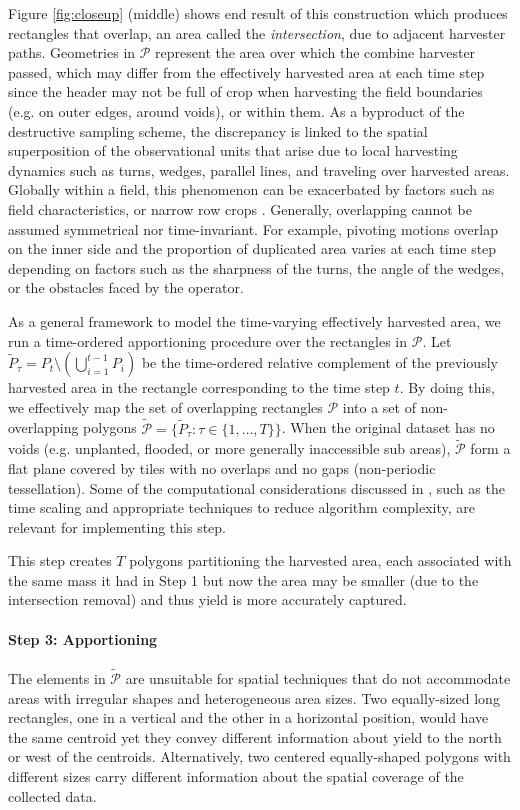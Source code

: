 \documentclass[12pt]{article}
\begin{document}
Figure \ref{fig:closeup} (middle) shows
end result of this construction which produces rectangles that
overlap, an area called the \emph{intersection}, due to adjacent
harvester paths. Geometries in $\mathcal{P}$ represent the area over
which the combine harvester passed, which may differ from the
effectively harvested area at each time step since the header may not
be full of crop when harvesting the field boundaries (e.g. on outer
edges, around voids), or within them. As a byproduct of the
destructive sampling scheme, the discrepancy is linked to the spatial
superposition of the observational units that arise due to local
harvesting dynamics such as turns, wedges, parallel lines, and
traveling over harvested areas. Globally within a field, this
phenomenon can be exacerbated by factors such as field
characteristics, or narrow row crops \cite{Ross2008}. Generally,
overlapping cannot be assumed symmetrical nor time-invariant. For
example, pivoting motions overlap on the inner side and the proportion
of duplicated area varies at each time step depending on factors such
as the sharpness of the turns, the angle of the wedges, or the
obstacles faced by the operator.

As a general framework to model the
time-varying effectively harvested area, we run a time-ordered
apportioning procedure over the rectangles in $\mathcal{P}$. Let
$\tilde{P}_\tau = P_t \setminus \left( \bigcup_{i = 1}^{t - 1} P_i
\right)$ be the time-ordered relative complement of the previously
harvested area in the rectangle corresponding to the time step $t$. By
doing this, we effectively map the set of overlapping rectangles
$\mathcal{P}$ into a set of non-overlapping polygons
$\tilde{\mathcal{P}} = \{\tilde{P}_{\tau}: \tau \in \{1, \dots, T
\}\}$. When the original dataset has no voids (e.g. unplanted,
flooded, or more generally inaccessible sub areas),
$\tilde{\mathcal{P}}$ form a flat plane covered by tiles with no
overlaps and no gaps (non-periodic tessellation). Some of the
computational considerations discussed in \cite{Drummond1999}, such as
the time scaling and appropriate techniques to reduce algorithm
complexity, are relevant for implementing this step.

This step creates $T$ polygons partitioning the harvested area, each
associated with the same mass it had in Step 1 but now the area may be
smaller (due to the intersection removal) and thus yield is more
accurately captured.

\paragraph*{Step 3: Apportioning} The elements in $\tilde{\mathcal{P}}$ are
unsuitable for spatial techniques that do not accommodate areas with
irregular shapes and heterogeneous area sizes. Two equally-sized long
rectangles, one in a vertical and the other in a horizontal position,
would have the same centroid yet they convey different information
about yield to the north or west of the centroids. Alternatively, two
centered equally-shaped polygons with different sizes carry different
information about the spatial coverage of the collected
data.
\end{document}
